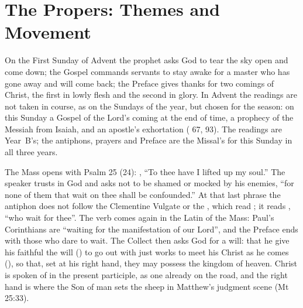 
\section{The Propers: Themes and Movement}

On the First Sunday of Advent the prophet asks God to tear the sky open and
come down; the Gospel commands servants to stay awake for a master who has
gone away and will come back; the Preface gives thanks for two comings of Christ, the first in lowly
flesh and the second in glory. In Advent the readings are not taken in
course, as on the Sundays of the year, but chosen for the season: on this
Sunday a Gospel of the Lord's coming at the end of time, a prophecy of the
Messiah from Isaiah, and an apostle's exhortation ( 67,
93). The readings are Year~B's; the antiphons, prayers and Preface are the
Missal's for this Sunday in all three years.

The Mass opens with Psalm 25 (24): , ``To thee
have I lifted up my soul.'' The speaker trusts in God and asks not to be
shamed or mocked by his enemies, ``for none of them that wait on thee shall be
confounded.'' At that last phrase the antiphon does not follow the Clementine
Vulgate or the , which read ; it
reads , ``who wait for thee''. The verb
 comes again in the Latin of the Mass: Paul's Corinthians are ``waiting for the manifestation
of our Lord'', and the Preface ends with those who dare to wait. The Collect
then asks God for a will: that he give his faithful the will
() to go out with just works to meet his Christ as he comes
(), so that, set at his right
hand, they may possess the kingdom of heaven. Christ is spoken of in the
present participle, as one already on the road, and the right hand is where
the Son of man sets the sheep in Matthew's judgment scene (Mt 25:33).

